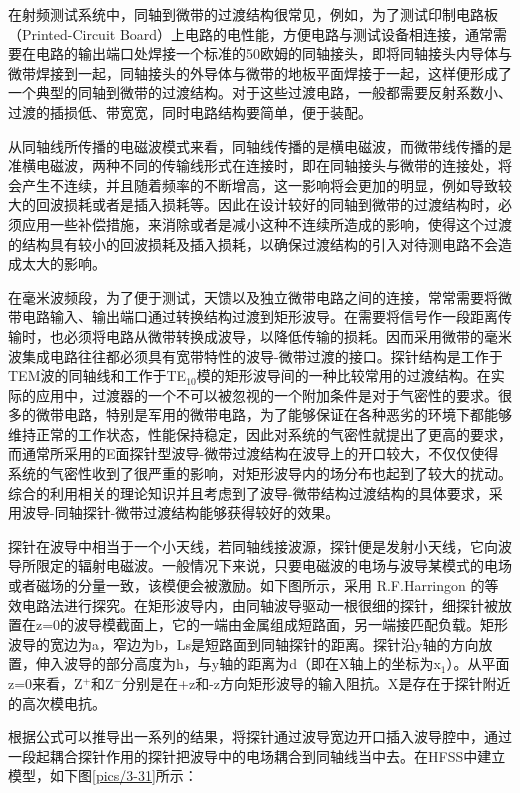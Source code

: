 在射频测试系统中，同轴到微带的过渡结构很常见，例如，为了测试印制电路板（Printed-Circuit Board）上电路的电性能，方便电路与测试设备相连接，通常需要在电路的输出端口处焊接一个标准的50欧姆的同轴接头，即将同轴接头内导体与微带焊接到一起，同轴接头的外导体与微带的地板平面焊接于一起，这样便形成了一个典型的同轴到微带的过渡结构。对于这些过渡电路，一般都需要反射系数小、过渡的插损低、带宽宽，同时电路结构要简单，便于装配。 

从同轴线所传播的电磁波模式来看，同轴线传播的是横电磁波，而微带线传播的是准横电磁波，两种不同的传输线形式在连接时，即在同轴接头与微带的连接处，将会产生不连续，并且随着频率的不断增高，这一影响将会更加的明显，例如导致较大的回波损耗或者是插入损耗等。因此在设计较好的同轴到微带的过渡结构时，必须应用一些补偿措施，来消除或者是减小这种不连续所造成的影响，使得这个过渡的结构具有较小的回波损耗及插入损耗，以确保过渡结构的引入对待测电路不会造成太大的影响。

在毫米波频段，为了便于测试，天馈以及独立微带电路之间的连接，常常需要将微带电路输入、输出端口通过转换结构过渡到矩形波导。在需要将信号作一段距离传输时，也必须将电路从微带转换成波导，以降低传输的损耗。因而采用微带的毫米波集成电路往往都必须具有宽带特性的波导-微带过渡的接口。探针结构是工作于TEM波的同轴线和工作于TE$_10$模的矩形波导间的一种比较常用的过渡结构。在实际的应用中，过渡器的一个不可以被忽视的一个附加条件是对于气密性的要求。很多的微带电路，特别是军用的微带电路，为了能够保证在各种恶劣的环境下都能够维持正常的工作状态，性能保持稳定，因此对系统的气密性就提出了更高的要求，而通常所采用的E面探针型波导-微带过渡结构在波导上的开口较大，不仅仅使得系统的气密性收到了很严重的影响，对矩形波导内的场分布也起到了较大的扰动。综合的利用相关的理论知识并且考虑到了波导-微带结构过渡结构的具体要求，采用波导-同轴探针-微带过渡结构能够获得较好的效果。

探针在波导中相当于一个小天线，若同轴线接波源，探针便是发射小天线，它向波导所限定的辐射电磁波。一般情况下来说，只要电磁波的电场与波导某模式的电场或者磁场的分量一致，该模便会被激励。如下图所示，采用 R.F.Harringon 的等效电路法进行探究。在矩形波导内，由同轴波导驱动一根很细的探针，细探针被放置在z=0的波导模截面上，它的一端由金属组成短路面，另一端接匹配负载。矩形波导的宽边为a，窄边为b，Ls是短路面到同轴探针的距离。探针沿y轴的方向放置，伸入波导的部分高度为h，与y轴的距离为d（即在X轴上的坐标为x$_1$）。从平面z=0来看，Z$^+$和Z$^-$分别是在+z和-z方向矩形波导的输入阻抗。X是存在于探针附近的高次模电抗。

根据公式可以推导出一系列的结果，将探针通过波导宽边开口插入波导腔中，通过一段起耦合探针作用的探针把波导中的电场耦合到同轴线当中去。在HFSS中建立模型，如下图\ref{pics/3-31}所示：


